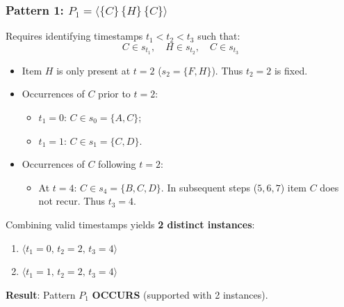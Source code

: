 \subsubsection{Pattern 1: $P_1 = \langle \{C\} \, \{H\} \, \{C\} \rangle$}
Requires identifying timestamps $t_1 < t_2 < t_3$ such that:
\begin{equation*}
C \in s_{t_1}, \quad H \in s_{t_2}, \quad C \in s_{t_3}
\end{equation*}
\begin{itemize}
    \item Item $H$ is only present at $t = 2$ ($s_2 = \{F, H\}$). Thus $t_2 = 2$ is fixed.
    \item Occurrences of $C$ prior to $t = 2$:
    \begin{itemize}[noitemsep]
        \item $t_1 = 0$: $C \in s_0 = \{A, C\}$;
        \item $t_1 = 1$: $C \in s_1 = \{C, D\}$.
    \end{itemize}
    \item Occurrences of $C$ following $t = 2$:
    \begin{itemize}[noitemsep]
        \item At $t = 4$: $C \in s_4 = \{B, C, D\}$. In subsequent steps ($5, 6, 7$) item $C$ does not recur. Thus $t_3 = 4$.
    \end{itemize}
\end{itemize}
Combining valid timestamps yields \textbf{2 distinct instances}:
\begin{enumerate}
    \item $\langle t_1 = 0, \, t_2 = 2, \, t_3 = 4 \rangle$
    \item $\langle t_1 = 1, \, t_2 = 2, \, t_3 = 4 \rangle$
\end{enumerate}
\textbf{Result}: Pattern $P_1$ \textbf{OCCURS} (supported with 2 instances).


